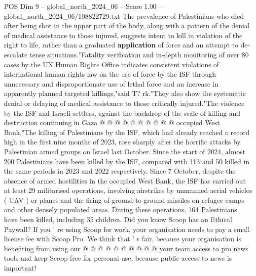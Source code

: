 \begin{textsample}{POS Dim 9 – global\_north\_2024\_06 – Score 1.00 – global\_north\_2024\_06/108822729.txt}
The prevalence of Palestinians who died after being shot in the upper part of the body, along with a pattern of the denial of medical assistance to those injured, suggests intent to kill in violation of the right to life, rather than a graduated \textbf{application} of force and an attempt to de-escalate tense situations."Fatality verification and in-depth monitoring of over 80 cases by the UN Human Rights Office indicates consistent violations of international human rights law on the use of force by the ISF through unnecessary and disproportionate use of lethal force and an increase in apparently planned targeted killings,"said T? rk."They also show the systematic denial or delaying of medical assistance to those critically injured."The violence by the ISF and Israeli settlers, against the backdrop of the scale of killing and destruction continuing in Gaza @ @ @ @ @ @ @ @ @ @ occupied West Bank."The killing of Palestinians by the ISF, which had already reached a record high in the first nine months of 2023, rose sharply after the horrific attacks by Palestinian armed groups on Israel last October.
Since the start of 2024, almost 200 Palestinians have been killed by the ISF, compared with 113 and 50 killed in the same periods in 2023 and 2022 respectively.
Since 7 October, despite the absence of armed hostilities in the occupied West Bank, the ISF has carried out at least 29 militarised operations, involving airstrikes by unmanned aerial vehicles ( UAV ) or planes and the firing of ground-to-ground missiles on refugee camps and other densely populated areas.
During these operations, 164 Palestinians have been killed, including 35 children.
Did you know Scoop has an Ethical Paywall?
If you ' re using Scoop for work, your organisation needs to pay a small license fee with Scoop Pro.
We think that ' s fair, because your organisation is benefiting from using our @ @ @ @ @ @ @ @ @ @ your team access to pro news tools and keep Scoop free for personal use, because public access to news is important!

\end{textsample}

